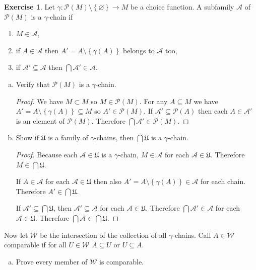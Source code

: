 \documentclass{article}
\theoremstyle{definition}
\newtheorem{question}{Exercise}
\newcommand{\set}[1]{\left\{#1\right\}}
\newcommand{\powset}{\mathcal{P}}
\begin{document}
\begin{question}
    Let \(\gamma:\powset(M)\setminus\set{\varnothing}\to M\) be a choice
    function. A subfamily \(\mathcal{A}\) of \(\powset(M)\) is a
    \(\gamma\)-chain if
    \begin{enumerate}[(1)]
        \item \(M\in\mathcal{A}\),
        \item if \(A\in\mathcal{A}\) then \(A'=A\setminus\set{\gamma(A)}\)
              belongs to \(\mathcal{A}\) too,
        \item if \(\mathcal{A}'\subseteq\mathcal{A}\) then
              \(\bigcap\mathcal{A}'\in\mathcal{A}\).
    \end{enumerate}

    \begin{enumerate}[a.]
        \item Verify that \(\powset(M)\) is a \(\gamma\)-chain.

              \begin{proof}
                  We have \(M\subset M\) so \(M\in\powset(M)\). For any
                  \(A\subseteq M\) we have
                  \(A'=A\setminus\set{\gamma(A)}\subseteq M\) so
                  \(A'\in\powset(M)\). If \(\mathcal{A}'\subseteq\powset(A)\)
                  then each \(A\in\mathcal{A}'\) is an element of
                  \(\powset(M)\). Therefore
                  \(\bigcap\mathcal{A}'\in\powset(M)\).
              \end{proof}

        \item Show if \(\mathfrak{U}\) is a family of \(\gamma\)-chains, then
              \(\bigcap\mathfrak{U}\) is a \(\gamma\)-chain.

              \begin{proof}
                  Because each \(\mathcal{A}\in\mathfrak{U}\) is a
                  \(\gamma\)-chain, \(M\in\mathcal{A}\) for each
                  \(\mathcal{A}\in\mathfrak{U}\). Therefore
                  \(M\in\bigcap\mathfrak{U}\).

                  If \(A\in\mathcal{A}\) for each \(\mathcal{A}\in\mathfrak{U}\)
                  then also \(A'=A\setminus\set{\gamma(A)}\in\mathcal{A}\) for
                  each chain. Therefore \(A'\in\bigcap\mathfrak{U}\).

                  If \(\mathcal{A}'\subseteq\bigcap\mathfrak{U}\), then
                  \(\mathcal{A}'\subseteq\mathcal{A}\) for each
                  \(\mathcal{A}\in\mathfrak{U}\). Therefore
                  \(\bigcap\mathcal{A}'\in\mathcal{A}\) for each
                  \(\mathcal{A}\in\mathfrak{U}\). Therefore
                  \(\bigcap\mathcal{A}\in\bigcap\mathfrak{U}\).
              \end{proof}
    \end{enumerate}
    Now let \(\mathcal{W}\) be the intersection of the collection of all
    \(\gamma\)-chains. Call \(A\in\mathcal{W}\) comparable if for all
    \(U\in\mathcal{W}\) \(A\subseteq U\) or \(U\subseteq A\).
    \begin{enumerate}[a.,resume]
        \item Prove every member of \(\mathcal{W}\) is comparable.


\end{enumerate}
\end{question}
\end{document}
